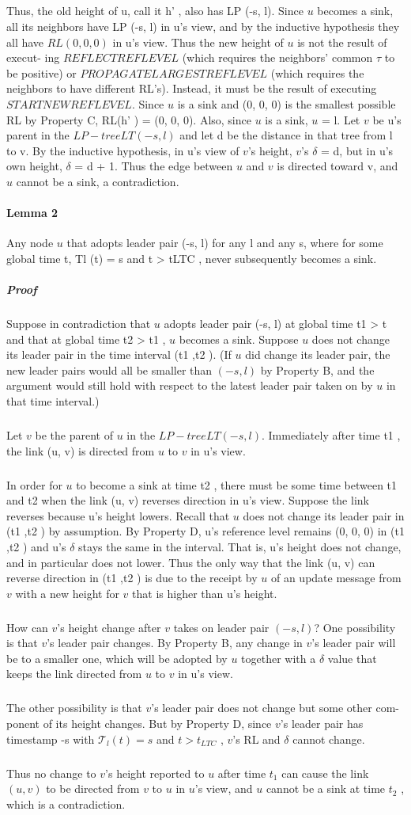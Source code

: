 \subparagraph{}Thus, the old height of u, call it h' , also has LP (-s, l). Since $u$ becomes a sink, all its neighbors have LP (-s, l) in u's view, and by the inductive hypothesis they all have $RL (0, 0, 0)$ in u's view. Thus the new height of $u$ is not the result of execut- ing $REFLECTREFLEVEL$ (which requires the neighbors' common $\tau$ to be positive) or $PROPAGATELARGESTREFLEVEL$ (which requires the neighbors to have different RL's). Instead, it must be the result of executing $STARTNEWREFLEVEL$. Since $u$ is a sink and (0, 0, 0) is the smallest possible RL by Property C, RL(h' ) = (0, 0, 0). Also, since $u$ is a sink, $u$ = l. Let $v$ be u's parent in the $LP-tree LT (-s, l)$ and let d be the distance in that tree from l to v. By the inductive hypothesis, in u's view of $v$'s height, $v$'s $\delta$ = d, but in u's own height, $\delta$ = d + 1. Thus the edge between $u$ and $v$ is directed toward v, and $u$ cannot be a sink, a contradiction.
\paragraph{Lemma 2}Any node $u$ that adopts leader pair (-s, l) for any l and any s, where for some global time t, Tl (t) = s and t > tLTC , never subsequently becomes a sink.
\subparagraph{Proof}Suppose in contradiction that $u$ adopts leader pair (-s, l) at global time t1 > t and that at global time t2 > t1 , $u$ becomes a sink. Suppose $u$ does not change its leader pair in the time interval (t1 ,t2 ). (If $u$ did change its leader pair, the new leader pairs would all be smaller than $(-s, l)$ by Property B, and the argument would still hold with respect to the latest leader pair taken on by $u$ in that time interval.)
\subparagraph{}Let $v$ be the parent of $u$ in the $LP-tree LT (-s, l)$. Immediately after time t1 , the link (u, v) is directed from $u$ to $v$ in u's view.
\subparagraph{}In order for $u$ to become a sink at time t2 , there must be some time between t1 and t2 when the link (u, v) reverses direction in u's view. Suppose the link reverses because u's height lowers. Recall that $u$ does not change its leader pair in (t1 ,t2 ) by assumption. By Property D, u's reference level remains (0, 0, 0) in (t1 ,t2 ) and u's $\delta$ stays the same in the interval. That is, u's height does not change, and in particular does not lower. Thus the only way that the link (u, v) can reverse direction in (t1 ,t2 ) is due to the receipt by $u$ of an update message from $v$ with a new height for $v$ that is higher than u's height.
\subparagraph{}How can $v$'s height change after $v$ takes on leader pair $(-s, l)$? One possibility is that $v$'s leader pair changes. By Property B, any change in $v$'s leader pair will be to a smaller one, which will be adopted by $u$ together with a $\delta$ value that keeps the link directed from $u$ to $v$ in u's view.
\subparagraph{}The other possibility is that $v$'s leader pair does not change but some other com- ponent of its height changes. But by Property D, since $v$'s leader pair has timestamp -s with $\mathcal{T} _l (t) = s$ and $t > t_{LTC}$ , $v$'s RL and $\delta$ cannot change.
\subparagraph{}Thus no change to $v$'s height reported to $u$ after time $t_1$ can cause the link $(u, v)$ to be directed from $v$ to $u$ in $u$'s view, and $u$ cannot be a sink at time $t_2$ , which is a contradiction.
